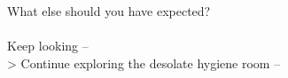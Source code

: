 What else should you have expected?\\
\\

 Keep looking -- \\
> Continue exploring the desolate hygiene room -- 